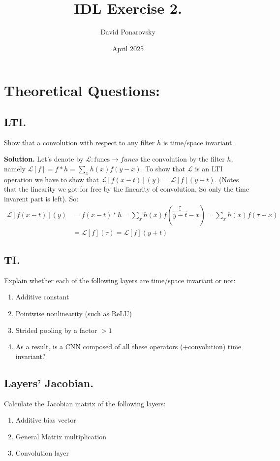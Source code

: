 \documentclass{article}
\title{IDL Exercise 2.}
\author{David Ponarovsky}
\date{April 2025}
\begin{document}
\maketitle

\section{Theoretical Questions:}

\subsection{LTI.} Show that a convolution with respect to any filter $h$ is time/space invariant.


\textbf{Solution.} Let's denote by $\mathcal{L} : \text{funcs} \rightarrow {funcs}$ the convolution by the filter $h$, namely $\mathcal{L}[f] = f*h = \sum_{x}{h(x)f(y-x)}$. To show that $\mathcal{L}$ is an LTI operation we have to show that $\mathcal{L}[f(x-t)](y) = \mathcal{L}[f](y+t)$. (Notes that the linearity we got for free by the linearity of convolution, So only the time invarent part is left). So: 
\begin{equation*}
    \begin{split}
      \mathcal{L}[f(x-t)](y) &=  f(x-t)*h = \sum_{x}{h(x)f( \overbrace{y-t}^{\tau}-x)} = \sum_{x}{h(x)f(\tau-x)}\\
      &= \mathcal{L}[f](\tau) = \mathcal{L}[f](y+t)
    \end{split}
\end{equation*}

 
\subsection{TI.} Explain whether each of the following layers are time/space invariant or not:
\begin{enumerate}
  \item Additive constant
  \item Pointwise nonlinearity (such as ReLU)
  \item Strided pooling by a factor $ > 1 $
  \item As a result, is a CNN composed of all these operators (+convolution) time invariant?
\end{enumerate}

\subsection{Layers’ Jacobian.} Calculate the Jacobian matrix of the following layers:
\begin{enumerate}
  \item Additive bias vector
  \item General Matrix multiplication
  \item Convolution layer
\end{enumerate}
\end{document}
